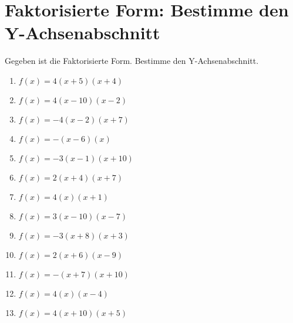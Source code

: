 \documentclass{article}%
\begin{document}
\section{Faktorisierte Form: Bestimme den Y{-}Achsenabschnitt}%
\label{sec:FaktorisierteFormBestimmedenY{-}Achsenabschnitt}%
Gegeben ist die Faktorisierte Form. Bestimme den Y{-}Achsenabschnitt.%
\begin{enumerate}[label=\alph*)]%
\item%
\newline\vspace{0.5cm} $f(x)=4(x+5)(x+4)$%
\item%
\newline\vspace{0.5cm} $f(x)=4(x-10)(x-2)$%
\item%
\newline\vspace{0.5cm} $f(x)=-4(x-2)(x+7)$%
\item%
\newline\vspace{0.5cm} $f(x)=-(x-6)(x)$%
\item%
\newline\vspace{0.5cm} $f(x)=-3(x-1)(x+10)$%
\item%
\newline\vspace{0.5cm} $f(x)=2(x+4)(x+7)$%
\item%
\newline\vspace{0.5cm} $f(x)=4(x)(x+1)$%
\item%
\newline\vspace{0.5cm} $f(x)=3(x-10)(x-7)$%
\item%
\newline\vspace{0.5cm} $f(x)=-3(x+8)(x+3)$%
\item%
\newline\vspace{0.5cm} $f(x)=2(x+6)(x-9)$%
\item%
\newline\vspace{0.5cm} $f(x)=-(x+7)(x+10)$%
\item%
\newline\vspace{0.5cm} $f(x)=4(x)(x-4)$%
\item%
\newline\vspace{0.5cm} $f(x)=4(x+10)(x+5)$%

\end{enumerate}
\end{document}
